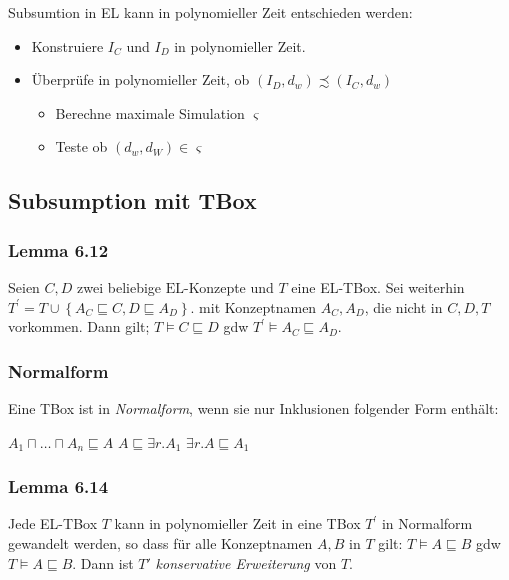 Subsumtion in EL kann in polynomieller Zeit entschieden werden:

\begin{itemize}
\item
  Konstruiere $I_{C}$ und $I_{D}$ in polynomieller Zeit.
\item
  Überprüfe in polynomieller Zeit, ob
  $\left( I_{D},d_{w} \right) \precsim \left( I_{C},d_{w} \right)$

  \begin{itemize}
  \item
    Berechne maximale Simulation $\varsigma$
  \item
    Teste ob $\left( d_{w},d_{W} \right) \in \varsigma$
  \end{itemize}
\end{itemize}

\subsection{Subsumption mit TBox}\label{subsumption-mit-tbox}

\subsubsection{Lemma 6.12}\label{lemma-6.12}

Seien $C,D$ zwei beliebige $\text{EL}$-Konzepte und $T$ eine
EL-TBox. Sei weiterhin
$T^{'} = T \cup \left\{ A_{C} \sqsubseteq C,D \sqsubseteq A_{D} \right\}$.
mit Konzeptnamen $A_{C},A_{D}$, die nicht in $C,D,T$ vorkommen. Dann
gilt; $T \models C \sqsubseteq D$ gdw
$T^{'} \models A_{C} \sqsubseteq A_{D}$.

\subsubsection{ Normalform}\label{normalform}

Eine TBox ist in \emph{Normalform}, wenn sie nur Inklusionen folgender
Form enthält:

$A_1 \sqcap \ldots \sqcap A_{n} \sqsubseteq A$
$A \sqsubseteq \exists r.A_1$ $\exists r.A \sqsubseteq A_1$

\subsubsection{Lemma 6.14}\label{lemma-6.14}

Jede EL-TBox $T$ kann in polynomieller Zeit in eine TBox $T^{'}$ in
Normalform gewandelt werden, so dass für alle Konzeptnamen $A,B$ in
$T$ gilt: $T \models A \sqsubseteq B$ gdw
$T \models A \sqsubseteq B$. Dann ist $T'$ \emph{konservative
Erweiterung} von $T$.


